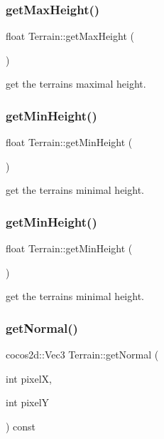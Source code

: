\subsubsection{\texorpdfstring{get\+Max\+Height()}{getMaxHeight()}\hspace{0.1cm}{\footnotesize\ttfamily [2/2]}}
{\footnotesize\ttfamily float Terrain\+::get\+Max\+Height (\begin{DoxyParamCaption}{ }\end{DoxyParamCaption})}

get the terrain\textquotesingle{}s maximal height. \mbox{\label{classTerrain_af16a50d3b4818314a3c2ba8e7be6e0a1}} 
\subsubsection{\texorpdfstring{get\+Min\+Height()}{getMinHeight()}\hspace{0.1cm}{\footnotesize\ttfamily [1/2]}}
{\footnotesize\ttfamily float Terrain\+::get\+Min\+Height (\begin{DoxyParamCaption}{ }\end{DoxyParamCaption})}

get the terrain\textquotesingle{}s minimal height. \mbox{\label{classTerrain_af16a50d3b4818314a3c2ba8e7be6e0a1}} 
\subsubsection{\texorpdfstring{get\+Min\+Height()}{getMinHeight()}\hspace{0.1cm}{\footnotesize\ttfamily [2/2]}}
{\footnotesize\ttfamily float Terrain\+::get\+Min\+Height (\begin{DoxyParamCaption}{ }\end{DoxyParamCaption})}

get the terrain\textquotesingle{}s minimal height. \mbox{\label{classTerrain_aa10abc4834b767de95d47cb67ac5dd23}} 
\subsubsection{\texorpdfstring{get\+Normal()}{getNormal()}\hspace{0.1cm}{\footnotesize\ttfamily [1/2]}}
{\footnotesize\ttfamily cocos2d\+::\+Vec3 Terrain\+::get\+Normal (\begin{DoxyParamCaption}\item[{int}]{pixelX,  }\item[{int}]{pixelY }\end{DoxyParamCaption}) const}

